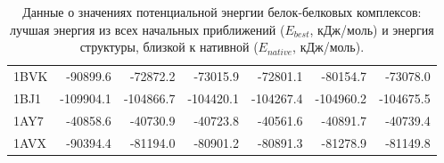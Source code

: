 \begin{table}[h]
\begin{center}
\begin{tabular}{ l | r | r | r | r | r | r }
       1BVK & -90899.6 & -72872.2 & -73015.9 & -72801.1 & -80154.7 & -73078.0 \\
       1BJ1 & -109904.1 & -104866.7 & -104420.1 & -104267.4 & -104960.2 & -104675.5 \\
       1AY7 & -40858.6 & -40730.9 & -40723.8 & -40561.6 & -40891.7 & -40739.4 \\
       1AVX & -90394.4 & -81194.0 & -80901.2 & -80891.3 & -81278.9 & -81149.8 \\
    \end{tabular}
    \end{center}
    \caption{Данные о значениях потенциальной энергии белок-белковых комплексов: лучшая энергия из всех начальных приближений ($E_{best}$, кДж/моль) и энергия структуры, близкой к нативной ($E_{native}$, кДж/моль).}
    \label{table_res_2}
  \end{table}

\FloatBarrier
